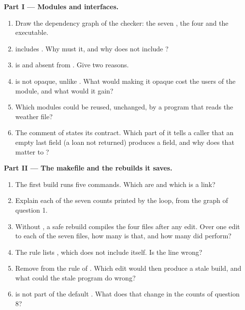 \begin{problem}
\medskip\noindent\textbf{Part I --- Modules and interfaces.}
\begin{enumerate}
\item Draw the dependency graph of the checker: the seven , the four  and the executable.
\item {} includes . Why must it, and why does  not include ?
\item {} is  and absent from . Give two reasons.
\item {} is not opaque, unlike . What would making it opaque cost the users of the
module, and what would it gain?
\item Which modules could be reused, unchanged, by a program that reads the weather file?
\item The comment of  states its contract. Which part of it tells a caller that an empty last field
(a loan not returned) produces a field, and why does that matter to ?
\end{enumerate}

\medskip\noindent\textbf{Part II --- The makefile and the rebuilds it saves.}
\begin{enumerate}[resume]
\item The first build runs five commands. Which are  and which is a link?
\item Explain each of the seven counts printed by the loop, from the graph of question 1.
\item Without , a safe rebuild compiles the four  files after any edit. Over one edit to each of the
seven files, how many  is that, and how many did  perform?
\item The rule  lists , which  does not include
itself. Is the line wrong?
\item Remove  from the rule of . Which edit would then produce a stale build, and what could
the stale program do wrong?
\item {} is not part of the default . What does that change in the counts of question 8?
\end{enumerate}


\end{problem}
